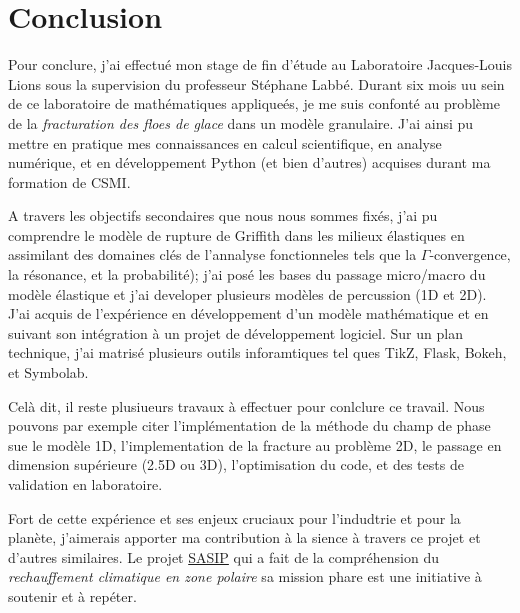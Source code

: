
\chapter{Conclusion} %

\label{Chapter6} %



Pour conclure, j'ai effectué mon stage de fin d'étude au Laboratoire Jacques-Louis Lions sous la supervision du professeur Stéphane Labbé. Durant six mois uu sein de ce laboratoire de mathématiques appliqueés, je me suis confonté au problème de la \emph{fracturation des floes de glace} dans un modèle granulaire. J'ai ainsi pu mettre en pratique mes connaissances en calcul scientifique, en analyse numérique, et en développement Python (et bien d'autres) acquises durant ma formation de CSMI. 

A travers les objectifs secondaires que nous nous sommes fixés, j'ai pu comprendre le modèle de rupture de Griffith dans les milieux élastiques en assimilant des domaines clés de l'annalyse fonctionneles tels que la $\Gamma$-convergence, la résonance, et la probabilité); j'ai posé les bases du passage micro/macro du modèle élastique et j'ai developer plusieurs modèles de percussion (1D et 2D). J'ai acquis de l'expérience en développement d’un modèle mathématique et en suivant son intégration à un projet de développement logiciel. Sur un plan technique, j'ai matrisé plusieurs outils inforamtiques tel ques TikZ, Flask, Bokeh, et Symbolab.

Celà dit, il reste plusiueurs travaux à effectuer pour conlclure ce travail. Nous pouvons par exemple citer l'implémentation de la méthode du champ de phase sue le modèle 1D, l'implementation de la fracture au problème 2D, le passage en dimension supérieure (2.5D ou 3D), l'optimisation du code, et des tests de validation en laboratoire.

Fort de cette expérience et ses enjeux cruciaux pour l'indudtrie et pour la planète, j'aimerais apporter ma contribution à la sience à travers ce projet et d'autres similaires. Le projet \href{https://sasip-climate.github.io/}{SASIP} qui a fait de la compréhension du \emph{rechauffement climatique en zone polaire} sa mission phare est une initiative à soutenir et à repéter.